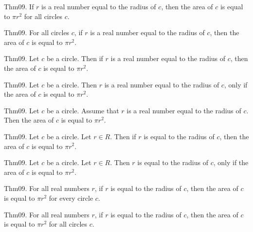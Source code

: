 \documentclass{article}
\begin{document}
Thm09. If $r$ is a real number equal to the radius of $c$, then the area of $c$ is equal to $\pi r ^ {2}$ for all circles $c$.

Thm09. For all circles $c$, if $r$ is a real number equal to the radius of $c$, then the area of $c$ is equal to $\pi r ^ {2}$.

Thm09. Let $c$ be a circle. Then if $r$ is a real number equal to the radius of $c$, then the area of $c$ is equal to $\pi r ^ {2}$.

Thm09. Let $c$ be a circle. Then $r$ is a real number equal to the radius of $c$, only if the area of $c$ is equal to $\pi r ^ {2}$.

Thm09. Let $c$ be a circle. Assume that $r$ is a real number equal to the radius of $c$. Then the area of $c$ is equal to $\pi r ^ {2}$.

Thm09. Let $c$ be a circle. Let $r \in R$. Then if $r$ is equal to the radius of $c$, then the area of $c$ is equal to $\pi r ^ {2}$.

Thm09. Let $c$ be a circle. Let $r \in R$. Then $r$ is equal to the radius of $c$, only if the area of $c$ is equal to $\pi r ^ {2}$.

Thm09. For all real numbers $r$, if $r$ is equal to the radius of $c$, then the area of $c$ is equal to $\pi r ^ {2}$ for every circle $c$.

Thm09. For all real numbers $r$, if $r$ is equal to the radius of $c$, then the area of $c$ is equal to $\pi r ^ {2}$ for all circles $c$.
\end{document}
